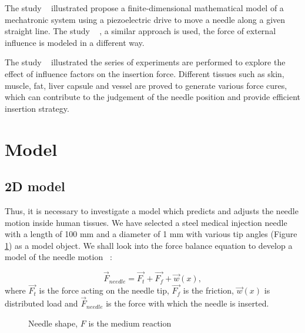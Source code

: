 \documentclass[a4paper]{jpconf}
\begin{document}
The study ~\cite{five} illustrated  propose a finite-dimensional mathematical model of a mechatronic system using a piezoelectric drive to move a needle along a given straight line. The study ~\cite{six} , a similar approach is used, the force of external influence is modeled in a different way.

The study ~\cite{seven} illustrated the series of experiments are performed to explore the effect of influence factors  on the insertion force. Different tissues such as skin, muscle, fat, liver capsule and vessel are proved to generate various force cures, which can contribute to the judgement of the needle position and provide efficient insertion strategy.

\section{Model}
\subsection{2D model}

Thus, it is necessary to investigate a model which predicts and adjusts the needle motion inside human tissues. We have selected a steel medical injection needle with a length of 100 mm and a diameter of 1 mm with various tip angles (Figure  \ref{n1}) as a model object. We shall look into the force balance equation to develop a model of the needle motion ~\cite{Model}:

\begin{equation} \label{eq1}
\vec{F}_{needle} = \vec{F_{t}} + \vec{F_{f}} + \vec{w}(x),
\end{equation}
where $\vec{F_{t}}$ is the force acting on the needle tip, $\vec{F_{f}}$ is the friction, $\vec{w}(x)$ is distributed load and $\vec{F}_{needle}$ is the force with which the needle is inserted.

\begin{figure}[h]
\caption{Needle shape, $F$ is the medium reaction}
\label{n1}
\end{figure}
\end{document}
